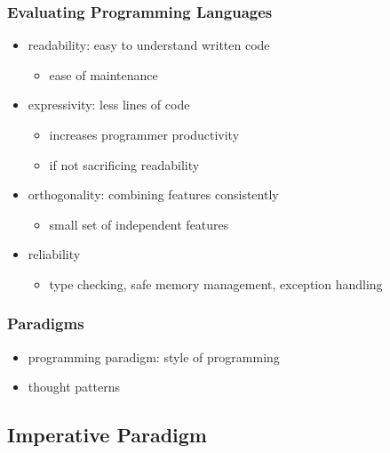 \documentclass[dvipsnames]{beamer}
\theoremstyle{plain}
\begin{document}
\begin{frame}
  \frametitle{Evaluating Programming Languages}

  \begin{itemize}
    \item \alert{readability}: easy to understand written code
    \begin{itemize}
      \item ease of maintenance
    \end{itemize}

    \pause
    \medskip
    \item \alert{expressivity}: less lines of code
    \begin{itemize}
      \item increases programmer productivity
      \item if not sacrificing readability
    \end{itemize}

    \pause
    \medskip
    \item \alert{orthogonality}: combining features consistently
    \begin{itemize}
      \item small set of independent features
    \end{itemize}

    \pause
    \medskip
    \item \alert{reliability}
    \begin{itemize}
      \item type checking, safe memory management, exception handling
    \end{itemize}
  \end{itemize}
\end{frame}

\begin{frame}
  \frametitle{Paradigms}

  \begin{itemize}
    \item programming paradigm: style of programming
    \item thought patterns
  \end{itemize}
\end{frame}

\subsection{Imperative Paradigm}
\end{document}
